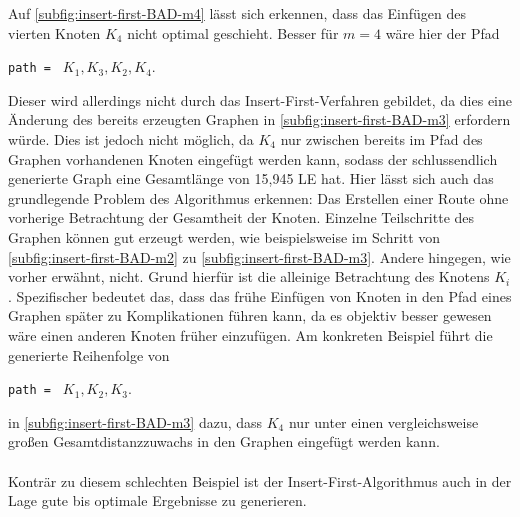 Auf \vref{subfig:insert-first-BAD-m4} lässt sich erkennen, dass das Einfügen des vierten Knoten $K_4$ nicht optimal geschieht. 
Besser für $m = 4$ wäre hier der Pfad 
\begin{addmargin}[1em]{2em}
    \lstinline{path = } $K_1, K_3, K_2, K_4$. 
    \end{addmargin}
Dieser wird allerdings nicht durch das Insert-First-Verfahren gebildet, da dies eine Änderung des bereits erzeugten Graphen in \vref{subfig:insert-first-BAD-m3} erfordern würde. 
Dies ist jedoch nicht möglich, da $K_4$ nur zwischen bereits im Pfad des Graphen vorhandenen Knoten eingefügt werden kann, sodass der schlussendlich generierte Graph eine Gesamtlänge von 15,945 \ac{LE} hat.
Hier lässt sich auch das grundlegende Problem des Algorithmus erkennen: Das Erstellen einer Route ohne vorherige Betrachtung der Gesamtheit der Knoten. 
Einzelne Teilschritte des Graphen können gut erzeugt werden, wie beispielsweise im Schritt von \vref{subfig:insert-first-BAD-m2} zu \vref{subfig:insert-first-BAD-m3}. 
Andere hingegen, wie vorher erwähnt, nicht. 
Grund hierfür ist die alleinige Betrachtung des Knotens $K_i$. 
Spezifischer bedeutet das, dass das frühe Einfügen von Knoten in den Pfad eines Graphen später zu Komplikationen führen kann, da es objektiv besser gewesen wäre einen anderen Knoten früher einzufügen.
Am konkreten Beispiel führt die generierte Reihenfolge von 
\begin{addmargin}[1em]{2em}
    \lstinline{path = } $K_1, K_2, K_3$. 
    \end{addmargin}
in \vref{subfig:insert-first-BAD-m3} dazu, dass $K_4$ nur unter einen vergleichsweise großen Gesamtdistanzzuwachs in den Graphen eingefügt werden kann. 
\\\\
Konträr zu diesem schlechten Beispiel ist der Insert-First-Algorithmus auch in der Lage gute bis optimale Ergebnisse zu generieren. 

